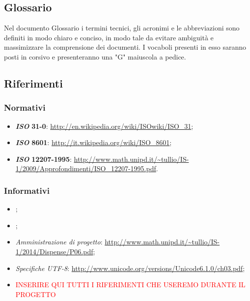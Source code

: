 \subsection{Glossario}
Nel documento Glossario i termini tecnici, gli acronimi e le abbreviazioni sono definiti in modo chiaro e conciso, in modo tale da evitare ambiguità e massimizzare la comprensione dei documenti.
\newline I vocaboli presenti in esso saranno posti in corsivo e presenteranno una "G" maiuscola a pedice.
\subsection{Riferimenti}
\subsubsection{Normativi}
\begin{itemize}
	\item
	\textbf{\textit{ISO}} \textbf{31-0}: \url{http://en.wikipedia.org/wiki/ISOwiki/ISO\_31};
	\item
	\textbf{\textit{ISO}} \textbf{8601}: \url{http://it.wikipedia.org/wiki/ISO\_8601};
	\item
	\textbf{\textit{ISO}} \textbf{12207-1995}: \url{http://www.math.unipd.it/~tullio/IS-1/2009/Approfondimenti/ISO\_12207-1995.pdf}.
\end{itemize}
\subsubsection{Informativi}
\begin{itemize}
	\item \textit{\PdPv};
	\item \textit{\PdQv};
	\item \textit{Amministrazione di progetto}: \url{http://www.math.unipd.it/~tullio/IS-1/2014/Dispense/P06.pdf};
	\item \textit{Specifiche \textit{UTF-8}}: \url{http://www.unicode.org/versions/Unicode6.1.0/ch03.pdf};
	\item \textcolor{red}{INSERIRE QUI TUTTI I RIFERIMENTI CHE USEREMO DURANTE IL PROGETTO}
\end{itemize}
